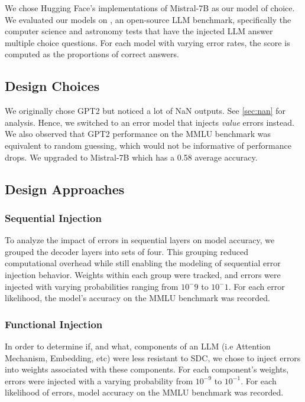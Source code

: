 We chose Hugging Face's implementations of Mistral-7B \cite{jiang2023mistral7b} as our model of choice. We evaluated our models on \cite{hendrycks2021measuringmassivemultitasklanguage}, an open-source LLM benchmark, specifically the computer science and astronomy tests that have the injected LLM answer multiple choice questions. For each model with varying error rates, the score is computed as the proportions of correct answers.

\subsection{Design Choices}
We originally chose GPT2 but noticed a lot of NaN outputs. See \ref{sec:nan} for analysis. Hence, we switched to an error model that injects \textit{value} errors instead. \\

We also observed that GPT2 performance on the MMLU benchmark was equivalent to random guessing, which would not be informative of performance drops. We upgraded to Mistral-7B which has a 0.58 average accuracy.

\subsection{Design Approaches}
\subsubsection{Sequential Injection} 
To analyze the impact of errors in sequential layers on model accuracy, we grouped the decoder layers into sets of four. This grouping reduced computational overhead while still enabling the modeling of sequential error injection behavior. Weights within each group were tracked, and errors were injected with varying probabilities ranging from $10^-9$ to $10^-1$. For each error likelihood, the model’s accuracy on the MMLU benchmark was recorded.

\subsubsection{Functional Injection} 
In order to determine if, and what, components of an LLM (i.e Attention Mechanism, Embedding, etc) were less resistant to SDC, we chose to inject errors into weights associated with these components. For each component's weights, errors were injected with a varying probability from $10^{-9}$ to $10^{-1}$. For each likelihood of errors, model accuracy on the MMLU benchmark was recorded.

